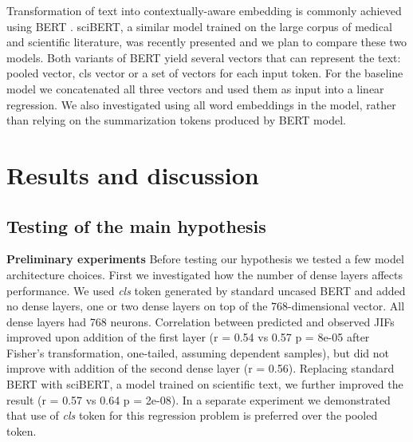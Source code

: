 \documentclass[11pt]{article}
\begin{document}
Transformation of text into contextually-aware embedding is commonly achieved using BERT \citep{DBLP:journals/corr/abs-1810-04805}. sciBERT, a similar model trained on the large corpus of medical and scientific literature, was recently presented \citep{DBLP:journals/corr/abs-1903-10676} and we plan to compare these two models. Both variants of BERT yield several vectors that can represent the text: pooled vector, cls vector or a set of vectors for each input token. For the baseline model we concatenated all three vectors and used them as input into a linear regression. We also investigated using all word embeddings in the model, rather than relying on the summarization tokens produced by BERT model.

\section{Results and discussion}
\subsection{Testing of the main hypothesis}
\textbf{Preliminary experiments} Before testing our hypothesis we tested a few model architecture choices. First we investigated how the number of dense layers affects performance. We used \textit{cls} token generated by standard uncased BERT and added no dense layers, one or two dense layers on top of the 768-dimensional vector. All dense layers had 768 neurons. Correlation between predicted and observed JIFs improved upon addition of the first layer (r = 0.54 vs 0.57 p = 8e-05 after Fisher's transformation, one-tailed, assuming dependent samples), but did not improve with addition of the second dense layer (r = 0.56). Replacing standard BERT with sciBERT, a model trained on scientific text, we further improved the result (r = 0.57 vs 0.64 p = 2e-08). In a separate experiment we demonstrated that use of \textit{cls} token for this regression problem is preferred over the pooled token.
\end{document}
